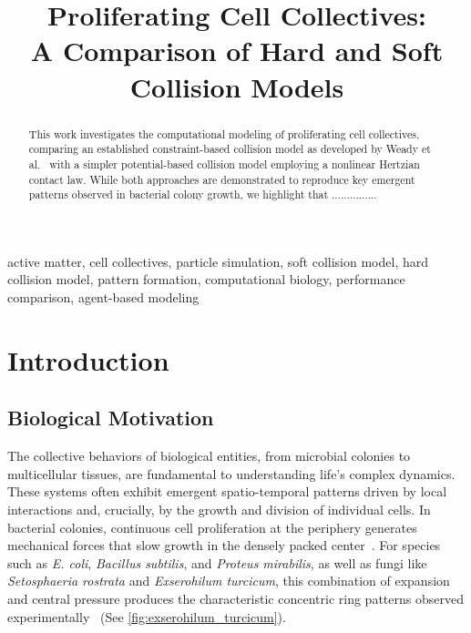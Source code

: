 \documentclass[conference]{IEEEtran}
\begin{document}
\title{Proliferating Cell Collectives: \\A Comparison of Hard and Soft Collision Models}

\author{
}

\maketitle

\begin{abstract}
    This work investigates the computational modeling of proliferating cell collectives, comparing an established constraint-based collision model as developed by Weady et al.~\cite{Weady2024} with a simpler potential-based collision model employing a nonlinear Hertzian contact law. While both approaches are demonstrated to reproduce key emergent patterns observed in bacterial colony growth, we highlight that  ...............

\end{abstract}

\begin{IEEEkeywords}
    active matter, cell collectives, particle simulation, soft collision model, hard collision model, pattern formation, computational biology, performance comparison, agent-based modeling
\end{IEEEkeywords}

\section{Introduction}
\subsection{Biological Motivation}

The collective behaviors of biological entities, from microbial colonies to multicellular tissues, are fundamental to understanding life’s complex dynamics. These systems often exhibit emergent spatio-temporal patterns driven by local interactions and, crucially, by the growth and division of individual cells. In bacterial colonies, continuous cell proliferation at the periphery generates mechanical forces that slow growth in the densely packed center~\cite{Wittmann2023}. For species such as \textit{E. coli}, \textit{Bacillus subtilis}, and \textit{Proteus mirabilis}, as well as fungi like \textit{Setosphaeria rostrata} and \textit{Exserohilum turcicum}, this combination of expansion and central pressure produces the characteristic concentric ring patterns observed experimentally~\cite{YAMAZAKI2005136} (See \autoref{fig:exserohilum_turcicum}).
\end{document}
